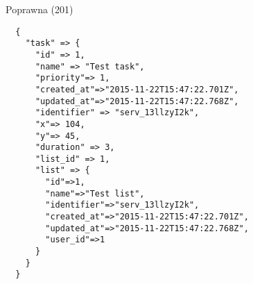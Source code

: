 Poprawna (201)
\begin{lstlisting}
  {
    "task" => {
      "id" => 1,
      "name" => "Test task",
      "priority"=> 1,
      "created_at"=>"2015-11-22T15:47:22.701Z",
      "updated_at"=>"2015-11-22T15:47:22.768Z",
      "identifier" => "serv_13llzyI2k",
      "x"=> 104,
      "y"=> 45,
      "duration" => 3,
      "list_id" => 1,
      "list" => {
        "id"=>1,
        "name"=>"Test list",
        "identifier"=>"serv_13llzyI2k",
        "created_at"=>"2015-11-22T15:47:22.701Z",
        "updated_at"=>"2015-11-22T15:47:22.768Z",
        "user_id"=>1
      }
    }
  }
\end{lstlisting}

